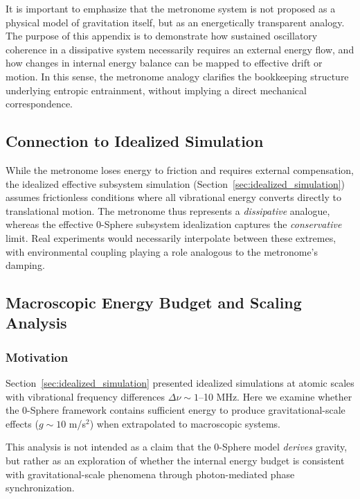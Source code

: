 \documentclass[%
 reprint,
 amsmath,amssymb,
 aps,
 prb,
]{revtex4-2}
\numberwithin{equation}{section}
\begin{document}
It is important to emphasize that the metronome system is not proposed as a physical model of gravitation itself, but as an energetically transparent analogy. The purpose of this appendix is to demonstrate how sustained oscillatory coherence in a dissipative system necessarily requires an external energy flow, and how changes in internal energy balance can be mapped to effective drift or motion. In this sense, the metronome analogy clarifies the bookkeeping structure underlying entropic entrainment, without implying a direct mechanical correspondence.

\subsection{Connection to Idealized Simulation}
\label{app:connection}

While the metronome loses energy to friction and requires external compensation, the idealized effective subsystem simulation (Section~\ref{sec:idealized_simulation}) assumes frictionless conditions where all vibrational energy converts directly to translational motion. The metronome thus represents a \textit{dissipative} analogue, whereas the effective 0-Sphere subsystem idealization captures the \textit{conservative} limit. Real experiments would necessarily interpolate between these extremes, with environmental coupling playing a role analogous to the metronome's damping.

\subsection{Macroscopic Energy Budget and Scaling Analysis}
\label{app:macroscopic}

\subsubsection{Motivation}

Section~\ref{sec:idealized_simulation} presented idealized simulations at atomic scales with vibrational frequency differences $\Delta\nu \sim 1$--10 MHz. Here we examine whether the 0-Sphere framework contains sufficient energy to produce gravitational-scale effects ($g \sim 10$ m/s$^2$) when extrapolated to macroscopic systems.

This analysis is not intended as a claim that the 0-Sphere model \textit{derives} gravity, but rather as an exploration of whether the internal energy budget is consistent with gravitational-scale phenomena through photon-mediated phase synchronization.
\end{document}

